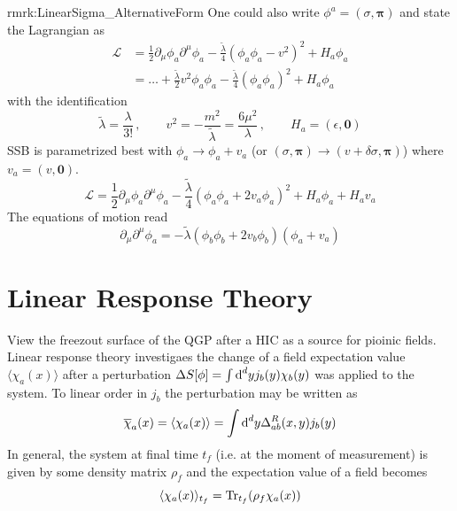 \begin{rmrk}{rmrk:LinearSigma_AlternativeForm}
    One could also write $\phi^a=(\sigma,\mathbf{\pi})$ and state the Lagrangian as
    \begin{subequations}
        \begin{align}
            \mathscr{L} & =\frac{1}{2}\partial_\mu\phi_a\partial^\mu\phi_a-\frac{\tilde{\lambda}}{4}(\phi_a\phi_a-v^2)^2+H_a\phi_a \\
                        & =\dots+\frac{\tilde{\lambda}}{2}v^2\phi_a\phi_a-\frac{\tilde{\lambda}}{4}(\phi_a\phi_a)^2+H_a\phi_a
        \end{align}
    \end{subequations}
    with the identification
    \begin{equation}
        \tilde{\lambda}=\frac{\lambda}{3!}\,,\qquad v^2=-\frac{m^2}{\tilde{\lambda}}=\frac{6\mu^2}{\lambda}\,,\qquad H_a=(\epsilon,\mathbf{0})
    \end{equation}
    SSB is parametrized best with $\phi_a\to\phi_a+v_a$ (or $(\sigma,\mathbf{\pi})\to(v+\delta\sigma,\mathbf{\pi})$) where $v_a=(v,\mathbf{0})$.
    \begin{equation}
        \mathscr{L} =\frac{1}{2}\partial_\mu\phi_a\partial^\mu\phi_a-\frac{\tilde{\lambda}}{4}(\phi_a\phi_a+2v_a\phi_a)^2+H_a\phi_a+H_av_a
    \end{equation}
    The equations of motion read
    \begin{equation}
        \partial_\mu\partial^\mu\phi_a=-\tilde{\lambda}(\phi_b\phi_b+2v_b\phi_b)(\phi_a+v_a)
    \end{equation}
\end{rmrk}

\section{Linear Response Theory}

View the freezout surface of the QGP after a HIC as a source for pioinic fields. Linear response theory investigaes the change of a field expectation value $\langle\chi_a(x)\rangle$ after a perturbation $\Delta S[\phi]=\int\text{d}^dyj_b(y)\chi_b(y)$ was applied to the system. To linear order in $j_b$ the perturbation may be written as
\begin{equation}
    \overline{\chi}_a(x)=\langle\chi_a(x)\rangle=\int\text{d}^dy\Delta^R_{ab}(x,y)j_b(y)
\end{equation}
In general, the system at final time $t_f$ (i.e. at the moment of measurement) is given by some density matrix $\rho_f$ and the expectation value of a field becomes
\begin{equation}
    \langle\chi_a(x)\rangle_{t_f}={\text{Tr}}_{t_f}(\rho_f\chi_a(x))
\end{equation}

